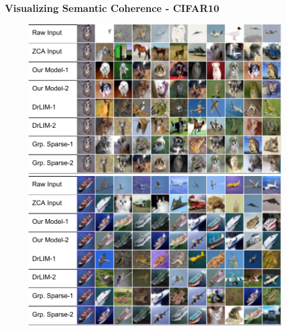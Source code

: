 \documentclass{beamer}
\begin{document}
\begin{frame}
\frametitle{Visualizing Semantic Coherence - CIFAR10}
\begin{center} 
\begin{figure}
\includegraphics[scale=0.40]{./Figures/Project1/NNclass1.pdf}\\ \vspace{0.25cm} 
\includegraphics[scale=0.40]{./Figures/Project1/NNclass2.pdf}
\end{figure}
\end{center}  
\end{frame} 
\end{document}
